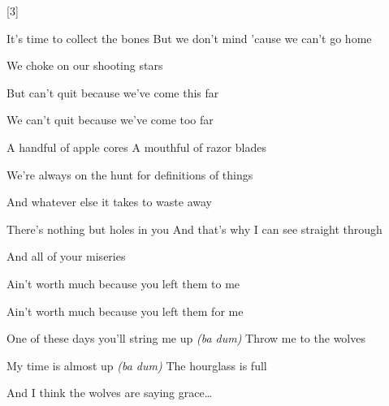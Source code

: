 [3]
\begin{strophe*}
  It's time to collect the bones\pause{}\hfill
  But we don't mind 'cause we can't go home\pause{}
  
  We choke on our shooting stars\pause{}
  
  But can't quit because we've come this far\pause{}
  
  We can't quit because we've come too far\null\br\br
\end{strophe*}
\begin{chorus*}
  A handful of apple cores \hfill
  A mouthful of razor blades
  
  We're always on the hunt for definitions of things
  
  And whatever else it takes to waste away\null\br
\end{chorus*}
\begin{strophe*}
  There's nothing but holes in you\pause{} \hfill
  And that's why I can see straight through\pause{}
  
  And all of your miseries\pause{}
  
  Ain't worth much because you left them to me\pause{}
  
  Ain't worth much because you left them for me\null\br\br
\end{strophe*}
\begin{chorus*}
  One of these days you'll string me up \hfill
  \emph{(ba dum)} \hfill
  Throw me to the wolves
  
  My time is almost up \hfill
  \emph{(ba dum)} \hfill
  The hourglass is full
  
  And I think the wolves are saying grace\dots\null
\end{chorus*}
